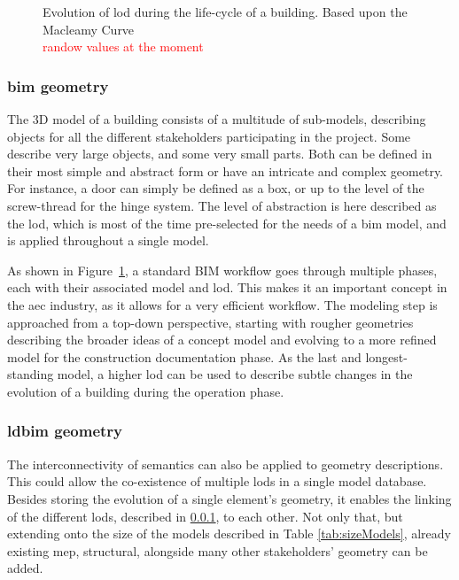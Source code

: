\begin{figure}[h]
	\centering
	
	\vspace{-0.3cm}
	\caption[Evolution of \acs{lod} during the life-cycle of a building]{Evolution of \acs{lod} during the life-cycle of a building. Based upon the Macleamy Curve \parencite{Ilozor2012}\\
	\textcolor{red}{randow values at the moment}}
	\label{fig:bimGraph}
\end{figure}

\subsubsection{\acs{bim} geometry} \label{subsec:bimGeometry}
The 3D model of a building consists of a multitude of sub-models, describing objects for all the different stakeholders participating in the project. Some describe very large objects, and some very small parts. Both can be defined in their most simple and abstract form or have an intricate and complex geometry. For instance, a door can simply be defined as a box, or up to the level of the screw-thread for the hinge system. The level of abstraction is here described as the \ac{lod}, which is most of the time pre-selected for the needs of a \ac{bim} model, and is applied throughout a single model.

As shown in Figure~\ref{fig:bimGraph}, a standard BIM workflow goes through multiple phases, each with their associated model and \ac{lod}. This makes it an important concept in the \ac{aec} industry, as it allows for a very efficient workflow. The modeling step is approached from a top-down perspective, starting with rougher geometries describing the broader ideas of a concept model and evolving to a more refined model for the construction documentation phase. As the last and longest-standing model, a higher \ac{lod} can be used to describe subtle changes in the evolution of a building during the operation phase.

\subsubsection{\acs{ldbim} geometry}
The interconnectivity of semantics can also be applied to geometry descriptions. This could allow the co-existence of multiple \ac{lod}s in a single model database. Besides storing the evolution of a single element's geometry, it enables the linking of the different \ac{lod}s, described in \ref{subsec:bimGeometry}, to each other. Not only that, but extending onto the size of the models described in Table \ref{tab:sizeModels}, already existing \ac{mep}, structural, alongside many other stakeholders' geometry can be added.

